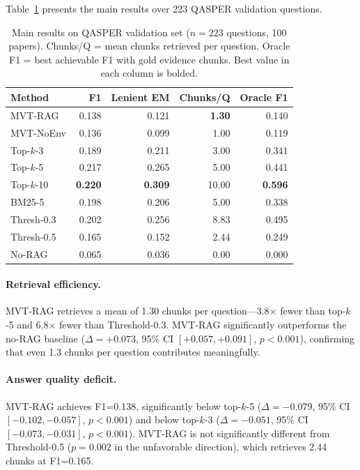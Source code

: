 \documentclass[11pt,letterpaper]{article}
\begin{document}
Table~\ref{tab:main} presents the main results over 223 QASPER validation questions.

\begin{table}[!htbp]
  \centering
  \caption{Main results on QASPER validation set ($n=223$ questions, 100 papers). Chunks/Q = mean chunks retrieved per
  question. Oracle F1 = best achievable F1 with gold evidence chunks. Best value in each column is bolded.}
  \label{tab:main}
  \begin{tabular}{lrrrr}
    \toprule
    Method & F1 & Lenient EM & Chunks/Q & Oracle F1 \\
    \midrule
    MVT-RAG      & 0.138 & 0.121 & \textbf{1.30} & 0.140 \\
    MVT-NoEnv    & 0.136 & 0.099 & 1.00          & 0.119 \\
    Top-$k$-3    & 0.189 & 0.211 & 3.00          & 0.341 \\
    Top-$k$-5    & 0.217 & 0.265 & 5.00          & 0.441 \\
    Top-$k$-10   & \textbf{0.220} & \textbf{0.309} & 10.00 & \textbf{0.596} \\
    BM25-5       & 0.198 & 0.206 & 5.00          & 0.338 \\
    Thresh-0.3   & 0.202 & 0.256 & 8.83          & 0.495 \\
    Thresh-0.5   & 0.165 & 0.152 & 2.44          & 0.249 \\
    No-RAG       & 0.065 & 0.036 & 0.00          & 0.000 \\
    \bottomrule
  \end{tabular}
\end{table}

\paragraph{Retrieval efficiency.} MVT-RAG retrieves a mean of 1.30 chunks per question---3.8$\times$ fewer than
top-$k$-5 and 6.8$\times$ fewer than Threshold-0.3. MVT-RAG significantly outperforms the no-RAG baseline
($\Delta=+0.073$, 95\% CI $[+0.057, +0.091]$, $p{<}0.001$), confirming that even 1.3 chunks per question contributes
meaningfully.

\paragraph{Answer quality deficit.} MVT-RAG achieves F1=0.138, significantly below top-$k$-5 ($\Delta=-0.079$, 95\% CI
$[-0.102, -0.057]$, $p{<}0.001$) and below top-$k$-3 ($\Delta=-0.051$, 95\% CI $[-0.073, -0.031]$, $p{<}0.001$).
MVT-RAG is not significantly different from Threshold-0.5 ($p=0.002$ in the unfavorable direction), which retrieves
2.44 chunks at F1=0.165.
\end{document}
